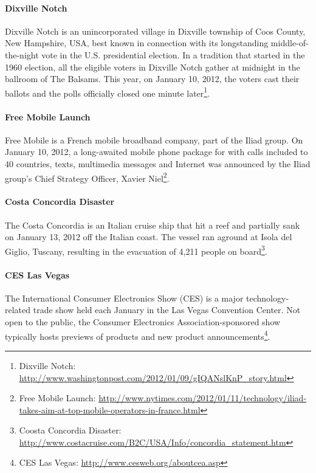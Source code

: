 \documentclass{acm_proc_article-sp}
\newcommand{\inlinelistingsize}{\fontsize{8pt}{11pt}}
\let\oldurl\url
\renewcommand{\url}[1]{\inlinelistingsize\oldurl{#1}}
\begin{document}
\paragraph{Dixville Notch}
Dixville Notch is an unincorporated village in Dixville township of Coos County, New Hampshire, USA, best known in connection with its longstanding middle-of-the-night vote in the U.S. presidential election.
In a tradition that started in the 1960 election, all the eligible voters in Dixville Notch gather at midnight in the ballroom of The Balsams.
This year, on January 10, 2012, the voters cast their ballots and the polls officially closed one minute later\footnote{Dixville Notch: \url{http://www.washingtonpost.com/2012/01/09/gIQANslKnP_story.html}}.

\paragraph{Free Mobile Launch}
Free Mobile is a French mobile broadband company, part of the Iliad group.
On January 10, 2012, a long-awaited mobile phone package for  with calls included to 40 countries, texts, multimedia messages and Internet was announced by the Iliad group's Chief Strategy Officer, Xavier Niel\footnote{Free Mobile Launch: \url{http://www.nytimes.com/2012/01/11/technology/iliad-takes-aim-at-top-mobile-operators-in-france.html}}.

\paragraph{Costa Concordia Disaster}
The Costa Concordia is an Italian cruise ship that hit a reef and partially sank on January 13, 2012 off the Italian coast.
The vessel ran aground at Isola del Giglio, Tuscany, resulting in the evacuation of 4,211 people on board\footnote{Coosta Concordia Disaster: \url{http://www.costacruise.com/B2C/USA/Info/concordia_statement.htm}}.

\paragraph{CES Las Vegas}
The International Consumer Electronics Show (CES) is a major technology-related trade show held each January in the Las Vegas Convention Center.
Not open to the public, the Consumer Electronics Association-sponsored show typically hosts previews of products and new product announcements\footnote{CES Las Vegas: \url{http://www.cesweb.org/aboutcea.asp}}.
\end{document}
